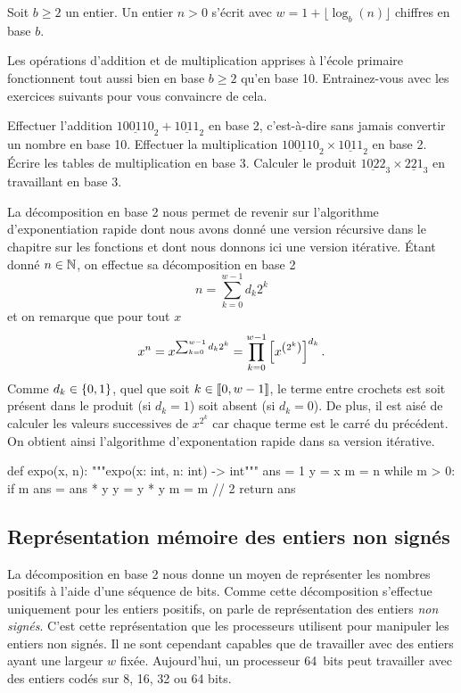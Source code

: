 \documentclass{magnoliaold}
\begin{document}
\begin{proposition}
  Soit $b \geq 2$ un entier. Un entier $n > 0$ s'écrit avec $w=1 + \lfloor \log_b (n) \rfloor$ chiffres
    en base $b$.
  \end{proposition}

\vspace{2ex}
Les opérations d'addition et de multiplication apprises à l'école primaire fonctionnent
tout aussi bien en base $b\geq 2$ qu'en base 10. Entrainez-vous avec les exercices suivants pour
vous convaincre de cela.
\vspace{2ex}
\begin{exos}
\exo Effectuer l'addition $\underline{100110}_2 + \underline{1011}_2$
  en base 2, c'est-à-dire sans jamais convertir un nombre en base 10.
\exo Effectuer la multiplication $\underline{100110}_2 \times \underline{1011}_2$
  en base 2.
\exo Écrire les tables de multiplication en base 3. Calculer
  le produit $\underline{1022}_3 \times \underline{221}_3$ en travaillant en base 3.
\end{exos}
\vspace{2ex}
La décomposition en base 2 nous permet de revenir sur l'algorithme d'exponentiation
rapide dont nous avons donné une version récursive dans le chapitre sur les fonctions et
dont nous donnons ici une version itérative. Étant donné $n\in\mathbb{N}$, on effectue
sa décomposition en base 2
\[n=\sum_{k=0}^{w-1} d_k 2^k\]
et on remarque que pour tout $x$
\[x^n=x^{\sum_{k=0}^{w-1} d_k 2^k}=\prod_{k=0}^{w-1} \left[x^{\left(2^k\right)}\right]^{d_k}.\]
Comme $d_k\in\left\{0,1\right\}$, quel que soit $k\in\left\llbracket 0,w-1\right\rrbracket$, le terme entre crochets
est soit présent dans le produit (si $d_k=1$) soit absent (si $d_k=0$). De plus, il est aisé de calculer les
valeurs successives de $x^{2^k}$ car chaque terme est le carré du précédent.
On obtient ainsi l'algorithme d'exponentation rapide dans sa version itérative.

\begin{pythoncodeline}
def expo(x, n):
    """expo(x: int, n: int) -> int"""
    ans = 1
    y = x
    m = n
    while m > 0:
        if m %
            ans = ans * y
        y = y * y
        m = m // 2
    return ans
\end{pythoncodeline}

\subsection{Représentation mémoire des entiers non signés}

La décomposition en base 2 nous donne un moyen de représenter les nombres positifs
à l'aide d'une séquence de bits.  Comme cette décomposition s'effectue uniquement pour
les entiers positifs, on parle de représentation des entiers \emph{non signés}. C'est cette
représentation que les processeurs utilisent pour manipuler les entiers non signés. Il ne sont
cependant capables que de travailler avec des entiers ayant une largeur $w$ fixée.
Aujourd'hui, un processeur 64~bits peut travailler avec des entiers codés sur 8, 16, 32
ou 64 bits.
\end{document}
